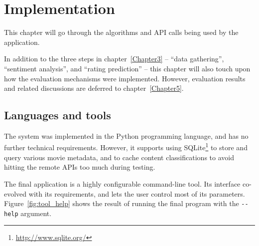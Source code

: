 
\chapter{Implementation} %

\label{Chapter4} %




This chapter will go through the algorithms and API calls being used by the application.

In addition to the three steps in chapter~\ref{Chapter3} -- ``data gathering'', ``sentiment analysis'', and ``rating prediction'' -- this chapter will also touch upon how the evaluation mechanisms were implemented. However, evaluation results and related discussions are deferred to chapter~\ref{Chapter5}.

\section{Languages and tools} %
\label{sec:languages_and_tools}

The system was implemented in the Python programming language, and has no further technical requirements. However, it supports using SQLite\footnote{\url{http://www.sqlite.org/}} to store and query various movie metadata, and to cache content classifications to avoid hitting the remote APIs too much during testing.

The final application is a highly configurable command-line tool. Its interface co-evolved with its requirements, and lets the user control most of its parameters. Figure~\ref{fig:tool_help} shows the result of running the final program with the \verb+--help+ argument.

